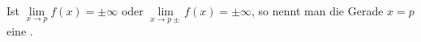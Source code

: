 Ist $\lim\limits_{x \to p} f(x) = \pm \infty$ oder $\lim\limits_{x \to p\pm} f(x) = \pm \infty$, so nennt man die Gerade $x = p$ eine .